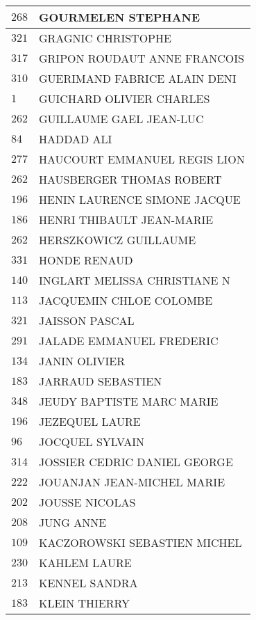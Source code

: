 \begin{xltabular}{\linewidth}{|l|X|}
    \hline
    $268$ & GOURMELEN STEPHANE \\
    \hline
    $321$ & GRAGNIC CHRISTOPHE \\
    \hline
    $317$ & GRIPON ROUDAUT ANNE FRANCOIS \\
    \hline
    $310$ & GUERIMAND FABRICE ALAIN DENI \\
    \hline
    $1$ & GUICHARD OLIVIER CHARLES \\
    \hline
    $262$ & GUILLAUME GAEL JEAN-LUC \\
    \hline
    $84$ & HADDAD ALI \\
    \hline
    $277$ & HAUCOURT EMMANUEL REGIS LION \\
    \hline
    $262$ & HAUSBERGER THOMAS ROBERT \\
    \hline
    $196$ & HENIN LAURENCE SIMONE JACQUE \\
    \hline
    $186$ & HENRI THIBAULT JEAN-MARIE \\
    \hline
    $262$ & HERSZKOWICZ GUILLAUME \\
    \hline
    $331$ & HONDE RENAUD \\
    \hline
    $140$ & INGLART MELISSA CHRISTIANE N \\
    \hline
    $113$ & JACQUEMIN CHLOE COLOMBE \\
    \hline
    $321$ & JAISSON PASCAL \\
    \hline
    $291$ & JALADE EMMANUEL FREDERIC \\
    \hline
    $134$ & JANIN OLIVIER \\
    \hline
    $183$ & JARRAUD SEBASTIEN \\
    \hline
    $348$ & JEUDY BAPTISTE MARC MARIE \\
    \hline
    $196$ & JEZEQUEL LAURE \\
    \hline
    $96$ & JOCQUEL SYLVAIN \\
    \hline
    $314$ & JOSSIER CEDRIC DANIEL GEORGE \\
    \hline
    $222$ & JOUANJAN JEAN-MICHEL MARIE \\
    \hline
    $202$ & JOUSSE NICOLAS \\
    \hline
    $208$ & JUNG ANNE \\
    \hline
    $109$ & KACZOROWSKI SEBASTIEN MICHEL \\
    \hline
    $230$ & KAHLEM LAURE \\
    \hline
    $213$ & KENNEL SANDRA \\
    \hline
    $183$ & KLEIN THIERRY \\

\end{xltabular}
